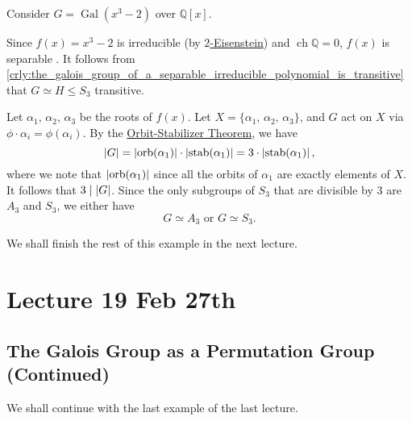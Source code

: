 \documentclass[notoc,notitlepage]{tufte-book}
\DeclareMathOperator{\Gal}{Gal}
\DeclareMathOperator{\stab}{stab}
\DeclareMathOperator{\orb}{orb}
\DeclareMathOperator{\ch}{ch}
\begin{document}
\begin{eg}
  Consider $G = \Gal(x^3 - 2)$ over $\mathbb{Q}[x]$.

  Since $f(x) = x^3 - 2$ is irreducible (by
  \hyperref[propo:eisenstein_s_criterion]{$2$-Eisenstein}) and $\ch \mathbb{Q} =
  0$, $f(x)$ is separable . It follows from
  \cref{crly:the_galois_group_of_a_separable_irreducible_polynomial_is_transitive}
  that $G \simeq H \leq S_3$ transitive.

  Let $\alpha_1, \, \alpha_2, \, \alpha_3$ be the roots of $f(x)$. Let $X = \{
  \alpha_1, \, \alpha_2, \, \alpha_3 \}$, and $G$ act on $X$ via $\phi \cdot
  \alpha_i = \phi(\alpha_i)$. By the
  \hyperref[thm:orbit_stabilizer_theorem]{Orbit-Stabilizer Theorem}, we have
  \begin{equation*}
    \abs{ G } = \abs{ \orb(\alpha_1) } \cdot \abs{ \stab(\alpha_1) } = 3 \cdot
    \abs{ \stab(\alpha_1) },
  \end{equation*}
  where we note that $\abs{ \orb(\alpha_1) }$ since all the orbits of $\alpha_1$
  are exactly elements of $X$. It follows that $3 \mid \left|G\right|$. Since the only
  subgroups of $S_3$ that are divisible by $3$ are $A_3$ and $S_3$, we either
  have
  \begin{equation*}
    G \simeq A_3 \text{ or } G \simeq S_3.
  \end{equation*}

\end{eg}

We shall finish the rest of this example in the next lecture.



\chapter{Lecture 19 Feb 27th}%
\label{chp:lecture_19_feb_27th}

\section{The Galois Group as a Permutation Group (Continued)}%
\label{sec:the_galois_group_as_a_permutation_group_continued}

We shall continue with the last example of the last lecture.
\end{document}
